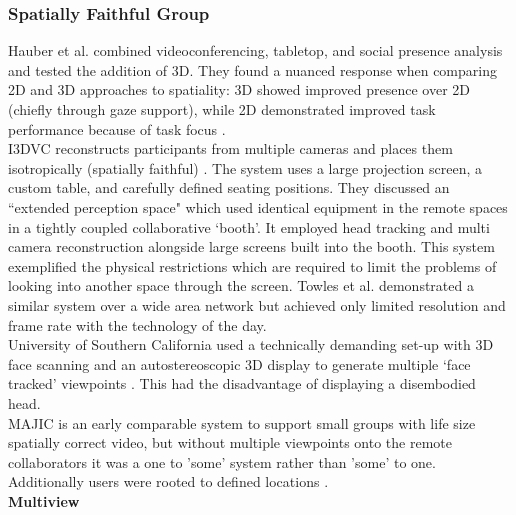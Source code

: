             \subsubsection{Spatially Faithful Group}
                Hauber et al. combined videoconferencing, tabletop, and social presence analysis and tested the addition of 3D. They found a nuanced response when comparing 2D and 3D approaches to spatiality: 3D showed improved presence over 2D (chiefly through gaze support), while 2D demonstrated improved task performance because of task focus \cite{Hauber2006}.\\
                I3DVC reconstructs participants from multiple cameras and places them isotropically (spatially faithful) \cite{Kauff2002, Kauff2002a}. The system uses a large projection screen, a custom table, and carefully defined seating positions. They discussed an ``extended perception space" which used identical equipment in the remote spaces in a tightly coupled collaborative `booth'. It employed head tracking and multi camera reconstruction alongside large screens built into the booth. This system exemplified the physical restrictions which are required to limit the problems of looking into another space through the screen. Towles et al. \cite{Fuchs:2002ww} demonstrated a similar system over a wide area network but achieved only limited resolution and frame rate with the technology of the day. \\ University of Southern California used a technically demanding set-up with 3D face scanning and an autostereoscopic 3D display to generate multiple `face tracked' viewpoints \cite{jones2009headspin}. This had the disadvantage of displaying a disembodied head.\\                
MAJIC is an early comparable system to support small groups with life size spatially correct video, but without multiple viewpoints onto the remote collaborators it was a one to 'some' system rather than 'some' to one. Additionally users were rooted to defined locations \cite{Ichikawa1995, Okada:1994et}.\\
\textbf{Multiview}

